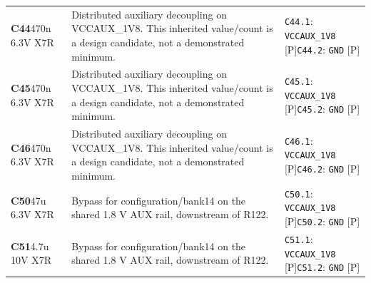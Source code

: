 \documentclass[11pt,a4paper]{article}
\begin{document}
\begin{longtable}{@{}P{27mm}P{83mm}P{58mm}@{}}
\textbf{C44}\newline 470n 6.3V X7R & Distributed auxiliary decoupling on VCCAUX\_1V8. This inherited value/count is a design candidate, not a demonstrated minimum. & \nolinkurl{C44.1}: \nolinkurl{VCCAUX_1V8} [P]\newline \nolinkurl{C44.2}: \nolinkurl{GND} [P] \\
\textbf{C45}\newline 470n 6.3V X7R & Distributed auxiliary decoupling on VCCAUX\_1V8. This inherited value/count is a design candidate, not a demonstrated minimum. & \nolinkurl{C45.1}: \nolinkurl{VCCAUX_1V8} [P]\newline \nolinkurl{C45.2}: \nolinkurl{GND} [P] \\
\textbf{C46}\newline 470n 6.3V X7R & Distributed auxiliary decoupling on VCCAUX\_1V8. This inherited value/count is a design candidate, not a demonstrated minimum. & \nolinkurl{C46.1}: \nolinkurl{VCCAUX_1V8} [P]\newline \nolinkurl{C46.2}: \nolinkurl{GND} [P] \\
\textbf{C50}\newline 47u 6.3V X7R & Bypass for configuration/bank14 on the shared 1.8 V AUX rail, downstream of R122. & \nolinkurl{C50.1}: \nolinkurl{VCCAUX_1V8} [P]\newline \nolinkurl{C50.2}: \nolinkurl{GND} [P] \\
\textbf{C51}\newline 4.7u 10V X7R & Bypass for configuration/bank14 on the shared 1.8 V AUX rail, downstream of R122. & \nolinkurl{C51.1}: \nolinkurl{VCCAUX_1V8} [P]\newline \nolinkurl{C51.2}: \nolinkurl{GND} [P] \\

\end{longtable}
\end{document}
